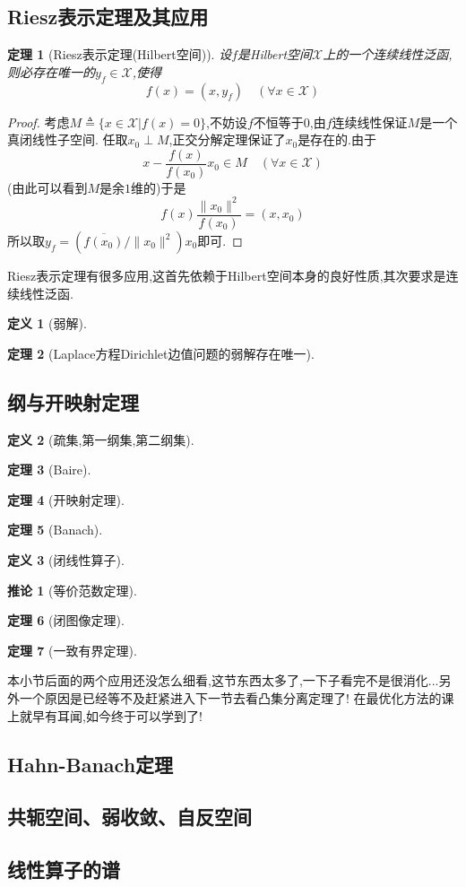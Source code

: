 \documentclass[12pt,a4paper]{article}
\newtheorem{thm}{定理}[subsection]  %
\newtheorem{corollary}{推论}[subsection] %
\newtheorem{definition}{定义}[subsection] %
\begin{document}
\subsection{Riesz表示定理及其应用}
\begin{thm}[Riesz表示定理(Hilbert空间)]
    设$f$是\rm{Hilbert}空间$\mathscr{X}$上的一个连续线性泛函,则必存在唯一的$y_f \in \mathscr{X}$,使得
    \[f(x) = (x,y_f)\quad (\forall x \in \mathscr{X})\]
\end{thm}
\begin{proof}
    考虑$M\triangleq \{x\in \mathscr{X}|f(x) = 0\}$,不妨设$f$不恒等于$0$,由$f$连续线性保证$M$是一个真闭线性子空间.
    任取$x_0 \perp M$,正交分解定理保证了$x_0$是存在的.由于\[x-\frac{f(x)}{f(x_0)}x_0 \in M \quad (\forall x \in \mathscr{X})\]
    (由此可以看到$M$是余$1$维的)于是\[f(x)\frac{\|x_0\|^2}{f(x_0)} = (x,x_0)\]所以取$y_f = (\overline{f(x_0)}/\|x_0\|^2) x_0$即可.

\end{proof}
Riesz表示定理有很多应用,这首先依赖于\rm{Hilbert}空间本身的良好性质,其次要求是连续线性泛函.
\begin{definition}[弱解]
\end{definition}
\begin{thm}[Laplace方程Dirichlet边值问题的弱解存在唯一]
\end{thm}
\subsection{纲与开映射定理}
\begin{definition}[疏集,第一纲集,第二纲集]
\end{definition}
\begin{thm}[Baire]
\end{thm}
\begin{thm}[开映射定理]
\end{thm}
\begin{thm}[Banach]
\end{thm}
\begin{definition}[闭线性算子]
\end{definition}
\begin{corollary}[等价范数定理]
\end{corollary}
\begin{thm}[闭图像定理]
\end{thm}
\begin{thm}[一致有界定理]
\end{thm}
本小节后面的两个应用还没怎么细看,这节东西太多了,一下子看完不是很消化...另外一个原因是已经等不及赶紧进入下一节去看凸集分离定理了!
在最优化方法的课上就早有耳闻,如今终于可以学到了!
\subsection{Hahn-Banach定理}
\subsection{共轭空间、弱收敛、自反空间}
\subsection{线性算子的谱}
\end{document}

